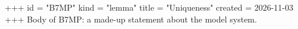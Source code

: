 +++
id = "B7MP"
kind = "lemma"
title = "Uniqueness"
created = 2026-11-03
+++
Body of B7MP: a made-up statement about the model system.
